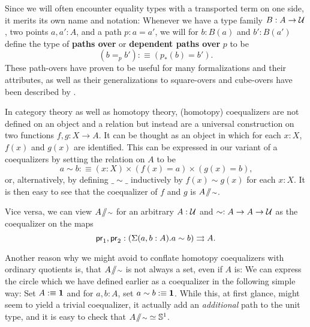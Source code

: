 \begin{remark}[Pathovers]
Since we will often encounter equality types with a transported term on one
side, it merits its own name and notation:
Whenever we have a type family $B : A \to \mathcal{U}$, two points $a, a' : A$,
and a path $p : a = a'$, we will for $b : B(a)$ and $b' : B(a')$ define the
type of
\textbf{paths over} or \textbf{dependent paths over} $p$ to be
\begin{equation*}
(b =_p b') :\equiv (p_*(b) = b') \text{.}
\end{equation*}
These path-overs have proven to be useful for many formalizations and their
attributes, as well as their generalizations to square-overs and
cube-overs have been described by \cite{licatacubical}.
\end{remark}

\begin{remark}
In category theory as well as homotopy theory, (homotopy) coequalizers are not
defined on an object and a relation
but instead are a universal construction on two functions $f, g : X \to A$.
It can be thought as an object in which for each $x : X$, $f(x)$ and $g(x)$ are identified.
This can be expressed in our variant of a coequalizers by setting the relation
on $A$ to be
\begin{equation*}
a \sim b :\equiv (x : X) \times (f(x) = a) \times (g(x) = b) \text{,}
\end{equation*}
or, alternatively, by defining $\_\sim\_$ inductively by $f(x) \sim g(x)$ for each
$x : X$.
It is then easy to see that the coequalizer of $f$ and $g$ is $A \! \sslash \! {\scriptstyle \sim}$.

Vice versa, we can view $A \! \sslash \! {\scriptstyle \sim}$ for an arbitrary $A : \mathcal{U}$ and
$\sim : A \to A \to \mathcal{U}$ as the coequalizer on the maps
\begin{equation*}
 \mathsf{pr}_1,\mathsf{pr}_2 : \left(\Sigma(a,b : A).a \sim b\right) \rightrightarrows A \text{.}
\end{equation*}
\end{remark}

Another reason why we might avoid to conflate homotopy coequalizers with
ordinary quotients is, that $A \! \sslash \! {\scriptstyle \sim}$ is not always a set, even if $A$ is:
We can express the circle which we have defined earlier as a coequalizer
in the following simple way:
Set $A :\equiv \mathbf{1}$ and for $a , b : A$, set $a \sim b :\equiv \mathbf{1}$.
While this, at first glance, might seem to yield a trivial coequalizer,
it actually add an \emph{additional} path to the unit type, and
it is easy to check that $A \! \sslash \! {\scriptstyle \sim} \simeq \mathbb{S}^1$.


